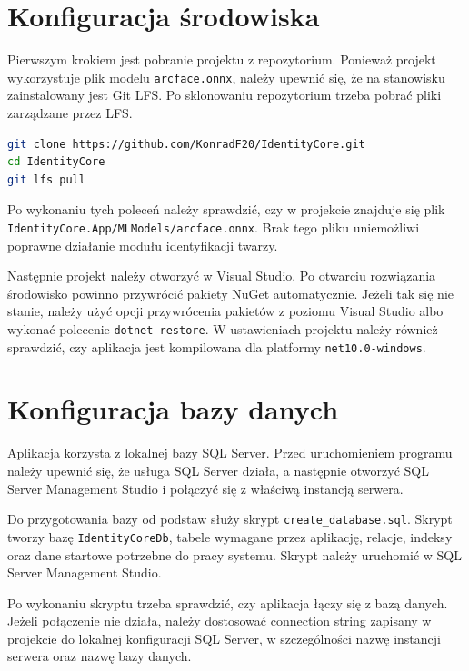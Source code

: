 \section{Konfiguracja środowiska}

Pierwszym krokiem jest pobranie projektu z repozytorium. Ponieważ projekt wykorzystuje plik modelu \texttt{arcface.onnx}, należy upewnić się, że na stanowisku zainstalowany jest Git LFS. Po sklonowaniu repozytorium trzeba pobrać pliki zarządzane przez LFS.

\begin{lstlisting}[language=bash, caption={Przykładowe pobranie projektu i plików Git LFS}, label={lst:git-lfs-pobranie}]
git clone https://github.com/KonradF20/IdentityCore.git
cd IdentityCore
git lfs pull
\end{lstlisting}

Po wykonaniu tych poleceń należy sprawdzić, czy w projekcie znajduje się plik \texttt{IdentityCore.App/MLModels/arcface.onnx}. Brak tego pliku uniemożliwi poprawne działanie modułu identyfikacji twarzy.

Następnie projekt należy otworzyć w Visual Studio. Po otwarciu rozwiązania środowisko powinno przywrócić pakiety NuGet automatycznie. Jeżeli tak się nie stanie, należy użyć opcji przywrócenia pakietów z poziomu Visual Studio albo wykonać polecenie \texttt{dotnet restore}. W ustawieniach projektu należy również sprawdzić, czy aplikacja jest kompilowana dla platformy \texttt{net10.0-windows}.

\section{Konfiguracja bazy danych}

Aplikacja korzysta z lokalnej bazy SQL Server. Przed uruchomieniem programu należy upewnić się, że usługa SQL Server działa, a następnie otworzyć SQL Server Management Studio i połączyć się z właściwą instancją serwera.

Do przygotowania bazy od podstaw służy skrypt \texttt{create\_database.sql}. Skrypt tworzy bazę \texttt{IdentityCoreDb}, tabele wymagane przez aplikację, relacje, indeksy oraz dane startowe potrzebne do pracy systemu. Skrypt należy uruchomić w SQL Server Management Studio.

Po wykonaniu skryptu trzeba sprawdzić, czy aplikacja łączy się z bazą danych. Jeżeli połączenie nie działa, należy dostosować connection string zapisany w projekcie do lokalnej konfiguracji SQL Server, w szczególności nazwę instancji serwera oraz nazwę bazy danych.

